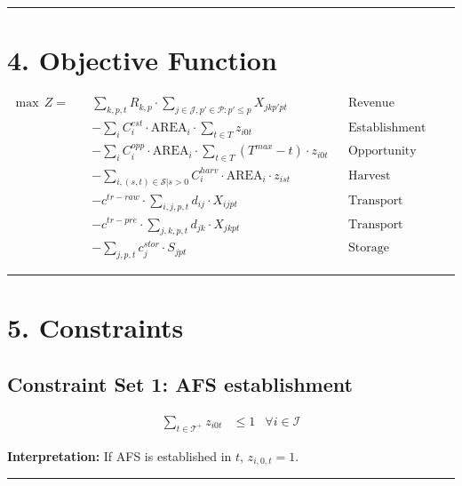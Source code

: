 \documentclass[
  11pt,
  11pt,
  a4paper]{article}
\begin{document}
\begin{center}\rule{0.5\linewidth}{0.5pt}\end{center}

\section{4. Objective Function}\label{objective-function}

\begin{align}
\max \, Z = \quad
&\sum_{k,p,t} R_{k,p} \cdot \sum_{j \in \mathcal{J}, p'\in \mathcal{P}: p' \leq p } X_{jkp'pt} && \text{Revenue} \\
&- \sum_{i} C^{est}_i \cdot \text{AREA}_i \cdot \sum_{t \in T} z_{i0t} && \text{Establishment} \\
&- \sum_{i} C^{opp}_i \cdot \text{AREA}_i \cdot \sum_{t \in T} (T^{max}-t) \cdot z_{i0t} && \text{Opportunity} \\
&- \sum_{i,(s,t)\in \mathcal{S}| s>0} C^{harv}_i \cdot \text{AREA}_i \cdot z_{ist} && \text{Harvest} \\
&- c^{tr-raw}\cdot\sum_{i,j,p,t} d_{ij} \cdot X_{ijpt} && \text{Transport (site→hub)} \\
&- c^{tr-pre}\cdot \sum_{j,k,p,t} d_{jk} \cdot X_{jkpt} && \text{Transport (hub→consumer)} \\
&- \sum_{j,p,t} c^{stor}_j \cdot S_{jpt} && \text{Storage}
\end{align}

\begin{center}\rule{0.5\linewidth}{0.5pt}\end{center}

\section{5. Constraints}\label{constraints}

\subsection{Constraint Set 1: AFS
establishment}\label{constraint-set-1-afs-establishment}

\begin{align}
\sum_{t \in \mathcal{T^+}} z_{i0t} &\leq 1 & \forall i \in \mathcal{I} \tag{C1}
\end{align}

\textbf{Interpretation:} If AFS is established in \(t\),
\(z_{i,0,t}=1\).

\begin{center}\rule{0.5\linewidth}{0.5pt}\end{center}
\end{document}

